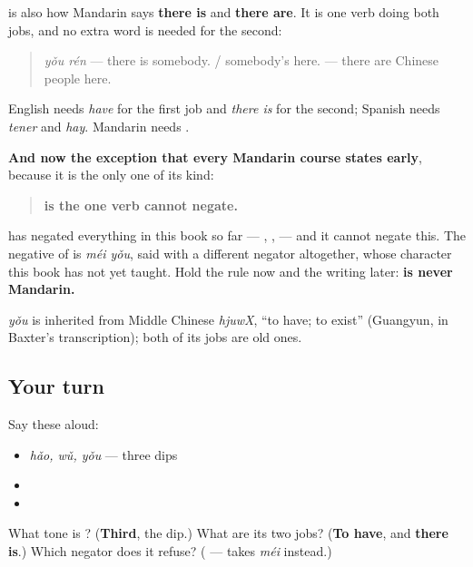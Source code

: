 \begin{grammarlens}[title={Grammar Lens: the same verb says there is}]
 is also how Mandarin says \textbf{there is} and \textbf{there are}. It is one verb doing both jobs, and no extra word is needed for the second:

\begin{quote}
\textbf{} \emph{yǒu rén} — there is somebody. / somebody's here. \textbf{} — there are Chinese people here.
\end{quote}

English needs \emph{have} for the first job and \emph{there is} for the second; Spanish needs \emph{tener} and \emph{hay}. Mandarin needs .

\textbf{And now the exception that every Mandarin course states early}, because it is the only one of its kind:

\begin{quote}
\textbf{ is the one verb  cannot negate.}
\end{quote}

 has negated everything in this book so far — , ,  — and it cannot negate this. The negative of  is \emph{méi yǒu}, said with a different negator altogether, whose character this book has not yet taught. Hold the rule now and the writing later: \textbf{ is never Mandarin.}
\end{grammarlens}

\begin{cousinweb}
\textbf{} \emph{yǒu} is inherited from Middle Chinese \emph{hjuwX}, \textquotedblleft{}to have; to exist\textquotedblright{} (Guangyun, in Baxter's transcription); both of its jobs are old ones.
\end{cousinweb}

\subsection*{Your turn}
Say these aloud:

\begin{itemize}
\raggedright
  \item \emph{hǎo, wǔ, yǒu} — three dips
  \item {} 
  \item {}
\end{itemize}

\begin{tcolorbox}[breakable,colback=teal!4,colframe=teal!35!black,title={Before you move on}]
What tone is ? (\textbf{Third}, the dip.) What are its two jobs? (\textbf{To have}, and \textbf{there is}.) Which negator does it refuse? (\textbf{} —  takes \emph{méi} instead.)
\end{tcolorbox}
